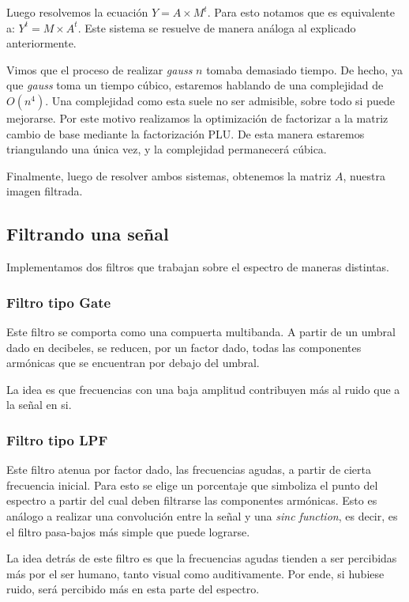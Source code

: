 Luego resolvemos la ecuaci\'on $ Y = A \times M^{t} $.
Para esto notamos que es equivalente a: $ Y^{t} = M \times A^{t} $.
Este sistema se resuelve de manera an\'aloga al explicado
anteriormente.

Vimos que el proceso de realizar {\em gauss} $n$ tomaba demasiado tiempo.
De hecho, ya que {\em gauss} toma un tiempo c\'ubico, estaremos hablando
de una complejidad de $O(n^4)$. Una complejidad como esta suele
no ser admisible, sobre todo si puede mejorarse.
Por este motivo realizamos la optimizaci\'on de factorizar a la matriz
cambio de base mediante la factorizaci\'on PLU.
De esta manera estaremos triangulando una \'unica vez, y la complejidad
permanecer\'a c\'ubica.

Finalmente, luego de resolver ambos sistemas, obtenemos la matriz $A$,
nuestra imagen filtrada.

\subsection{Filtrando una se\~nal}

Implementamos dos filtros que trabajan sobre el espectro
de maneras distintas.

\subsubsection{Filtro tipo Gate}

Este filtro se comporta como una compuerta multibanda. A partir de un
umbral dado en decibeles,
se reducen, por un factor dado, todas las componentes arm\'onicas que
se encuentran por debajo del umbral.

La idea es que frecuencias con una baja amplitud contribuyen m\'as
al ruido que a la se\~nal en si.

\subsubsection{Filtro tipo LPF}

Este filtro atenua por factor dado, las frecuencias agudas,
a partir de cierta frecuencia inicial.
Para esto se elige un porcentaje que
simboliza el punto del espectro a partir del cual
deben filtrarse las componentes arm\'onicas.
Esto es an\'alogo a realizar una convoluci\'on entre la se\~nal y una
{\em sinc function}, es decir, es el filtro pasa-bajos m\'as simple
que puede lograrse\cite[The Ideal Lowpass Filter]{stanford}.

La idea detr\'as de este filtro es que la frecuencias agudas tienden
a ser percibidas m\'as por el ser humano, tanto visual como auditivamente.
Por ende, si hubiese ruido, ser\'a percibido m\'as en esta parte del
espectro.

